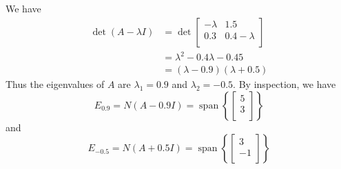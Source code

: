 \documentclass{article}
\DeclareMathOperator{\spn}{span}
\begin{document}
\begin{example}
      We have
      \begin{align*}
        \det (A - \lambda I) &= \det
        \begin{bmatrix}
          -\lambda & 1.5\\
          0.3 & 0.4 - \lambda\\
        \end{bmatrix}\\
        &= \lambda^2 - 0.4\lambda -0.45\\
        &= (\lambda - 0.9)(\lambda + 0.5)
      \end{align*}
      Thus the eigenvalues of $A$ are $\lambda_1 = 0.9$ and $\lambda_2 = -0.5$. By inspection, we have \[
        E_{0.9} = N(A - 0.9I) = \spn\left\{
          \begin{bmatrix}
            5\\3\\
        \end{bmatrix}\right\}
      \] and \[
        E_{-0.5} = N(A + 0.5I) = \spn\left\{
          \begin{bmatrix}
            3\\-1\\
        \end{bmatrix}\right\}
      \]


\end{example}
\end{document}
